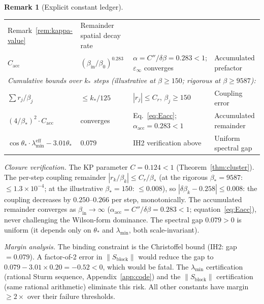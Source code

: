 \documentclass[11pt]{article}
\theoremstyle{definition}
\newtheorem{remark}[theorem]{Remark}
\begin{document}
\begin{remark}[Explicit constant ledger]
\begin{center}
\begin{tabular}{lllp{5cm}}
Remark~\ref{rem:kappa-value}
& Remainder spatial decay rate\\
$C_{\mathrm{acc}}$ & $(\beta_{\mathrm{in}}/\beta_0)^{0.283}$ & $\alpha=C''/\delta\beta=0.283<1$; $\varepsilon_\infty$ converges
& Accumulated prefactor\\
\midrule
\multicolumn{4}{l}{\emph{Cumulative bounds over $k_*$ steps
(illustrative at $\beta\ge 150$; rigorous at $\beta\ge 9587$):}}\\
\midrule
$\sum r_j/\beta_j$ & $\le k_*/125$ & $|r_j|\le C_r$, $\beta_j\ge 150$
& Coupling error\\
$(4/\beta_*)^2\cdot C_{\mathrm{acc}}$ & converges &
Eq.~\eqref{eq:Eacc}; $\alpha_{\mathrm{acc}}=0.283<1$
& Accumulated remainder\\
$\cos\theta_*\cdot\lambda_{\min}^{\mathrm{eff}}
-3.01\theta_*$ & $0.079$ &
IH2 verification above
& Uniform spectral gap\\
\bottomrule
\end{tabular}
\end{center}

\noindent\emph{Closure verification.}
The KP parameter $C=0.124<1$ (Theorem~\ref{thm:cluster}).
The per-step coupling remainder $|r_k/\beta_k|\le C_r/\beta_*$
(at the rigorous $\beta_*=9587$: $\le 1.3\times 10^{-4}$;
at the illustrative $\beta_*=150$: $\le 0.008$),
so $|\delta\beta_k-0.258|\le 0.008$: the coupling decreases by
$0.250$--$0.266$ per step, monotonically.
The accumulated remainder converges as
$\beta_{\mathrm{in}}\to\infty$ ($\alpha_{\mathrm{acc}}
=C''/\delta\beta=0.283<1$; equation~\eqref{eq:Eacc}),
never challenging the Wilson-form dominance.
The spectral gap $0.079>0$ is uniform
(it depends only on $\theta_*$ and $\lambda_{\min}$, both
scale-invariant).

\emph{Margin analysis.}
The binding constraint is the Christoffel bound
(IH2: gap $=0.079$).  A factor-of-2 error in
$\|S_{\mathrm{block}}\|$ would reduce the gap to
$0.079-3.01\times 0.20=-0.52<0$, which would be fatal.
The $\lambda_{\min}$ certification
(rational Sturm sequence, Appendix~\ref{app:code}) and the
$\|S_{\mathrm{block}}\|$ certification
(same rational arithmetic) eliminate this risk.
All other constants have margin $\ge 2\times$
over their failure thresholds.
\end{remark}
\end{document}
